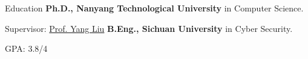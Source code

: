 \begin{rubric}{Education}
\entry*[2021 -- now]%
	\textbf{Ph.D., Nanyang Technological University} in Computer Science.
        \par Supervisor: \href{https://personal.ntu.edu.sg/yangliu/}{Prof. Yang Liu}
\entry*[2017 -- 2021]%
	\textbf{B.Eng., Sichuan University} in Cyber Security.
        \par GPA: 3.8/4
\end{rubric}
